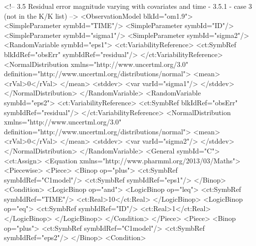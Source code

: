 \documentclass[a4paper,10pt]{article}
\begin{document}
\begin{xmlcode}
<!-- 3.5 Residual error magnitude varying with covariates and time - 3.5.1 - case 3  (not in the K/K list) -->
<ObservationModel blkId="om1.9">
    <SimpleParameter symbId="TIME"/>
    <SimpleParameter symbId="ID"/>
    <SimpleParameter symbId="sigma1"/>
    <SimpleParameter symbId="sigma2"/>
    <RandomVariable symbId="eps1">
        <ct:VariabilityReference>
            <ct:SymbRef blkIdRef="obsErr" symbIdRef="residual"/>
        </ct:VariabilityReference>
        <NormalDistribution xmlns="http://www.uncertml.org/3.0" definition="http://www.uncertml.org/distributions/normal">
            <mean>
                <rVal>0</rVal>
            </mean>
            <stddev>
                <var varId="sigma1"/>
            </stddev>
        </NormalDistribution>
    </RandomVariable>
    <RandomVariable symbId="eps2">
        <ct:VariabilityReference>
            <ct:SymbRef blkIdRef="obsErr" symbIdRef="residual"/>
        </ct:VariabilityReference>
        <NormalDistribution xmlns="http://www.uncertml.org/3.0" definition="http://www.uncertml.org/distributions/normal">
            <mean>
                <rVal>0</rVal>
            </mean>
            <stddev>
                <var varId="sigma2"/>
            </stddev>
        </NormalDistribution>
    </RandomVariable>
    <General symbId="C">
        <ct:Assign>
            <Equation xmlns="http://www.pharmml.org/2013/03/Maths">
                <Piecewise>
                    <Piece>
                        <Binop op="plus">
                            <ct:SymbRef symbIdRef="C1model"/>
                            <ct:SymbRef symbIdRef="eps1"/>
                        </Binop>
                        <Condition>
                            <LogicBinop op="and">
                                <LogicBinop op="leq">
                                    <ct:SymbRef symbIdRef="TIME"/>
                                    <ct:Real>10</ct:Real>
                                </LogicBinop>
                                <LogicBinop op="eq">
                                    <ct:SymbRef symbIdRef="ID"/>
                                    <ct:Real>1</ct:Real>
                                </LogicBinop>
                            </LogicBinop>
                        </Condition>
                    </Piece>
                    <Piece>
                        <Binop op="plus">
                            <ct:SymbRef symbIdRef="C1model"/>
                            <ct:SymbRef symbIdRef="eps2"/>
                        </Binop>
                        <Condition>

\end{xmlcode}
\end{document}
